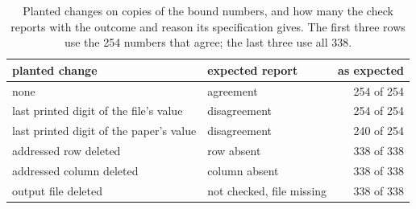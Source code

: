 \vspace{0.5em}
\begin{table}[H]
\centering
\small
\caption{Planted changes on copies of the bound numbers, and how many the check reports with
the outcome and reason its specification gives. The first three rows use the 254 numbers that
agree; the last three use all 338.}
\label{tab:cc-planted}
\begin{tabular}{@{}>{\raggedright\arraybackslash}p{}>{\raggedright\arraybackslash}p{}r@{}}
\toprule
planted change & expected report & as expected \\
\midrule
none & agreement & 254 of 254 \\
last printed digit of the file's value & disagreement & 254 of 254 \\
last printed digit of the paper's value & disagreement & 240 of 254 \\
addressed row deleted & row absent & 338 of 338 \\
addressed column deleted & column absent & 338 of 338 \\
output file deleted & not checked, file missing & 338 of 338 \\
\bottomrule
\end{tabular}
\end{table}
